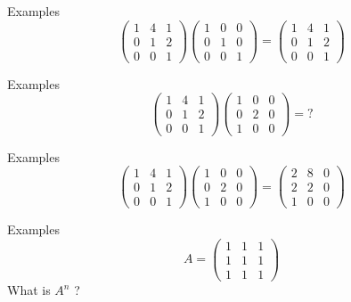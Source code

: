 \documentclass[usenames,dvipsnames]{beamer}
\begin{document}
\begin{frame}{Examples}
   \[
\begin{pmatrix}
1 & 4 & 1 \\
0 & 1 & 2 \\
0 & 0 & 1
\end{pmatrix}
\begin{pmatrix}
1 & 0 & 0 \\
0 & 1 & 0 \\
0 & 0 & 1
\end{pmatrix}
    =
\begin{pmatrix}
1 & 4 & 1 \\
0 & 1 & 2 \\
0 & 0 & 1
\end{pmatrix}
\] 
\end{frame}



\begin{frame}{Examples}
   \[
\begin{pmatrix}
1 & 4 & 1 \\
0 & 1 & 2 \\
0 & 0 & 1
\end{pmatrix}
\begin{pmatrix}
1 & 0 & 0 \\
0 & 2 & 0 \\
1 & 0 & 0
\end{pmatrix}
    =\text{?} 
\] 
\end{frame}

\begin{frame}{Examples}
   \[
\begin{pmatrix}
1 & 4 & 1 \\
0 & 1 & 2 \\
0 & 0 & 1
\end{pmatrix}
\begin{pmatrix}
1 & 0 & 0 \\
0 & 2 & 0 \\
1 & 0 & 0
\end{pmatrix}
    =
\begin{pmatrix}
2 & 8 & 0 \\
2 & 2 & 0 \\
1 & 0 & 0
\end{pmatrix}
\] 
\end{frame}


\begin{frame}{Examples}
   \[A=
\begin{pmatrix}
1 & 1 & 1 \\
1 & 1 & 1 \\
1 & 1 & 1
\end{pmatrix}
\] 
What is $A^n$ ?
\end{frame}
\end{document}
